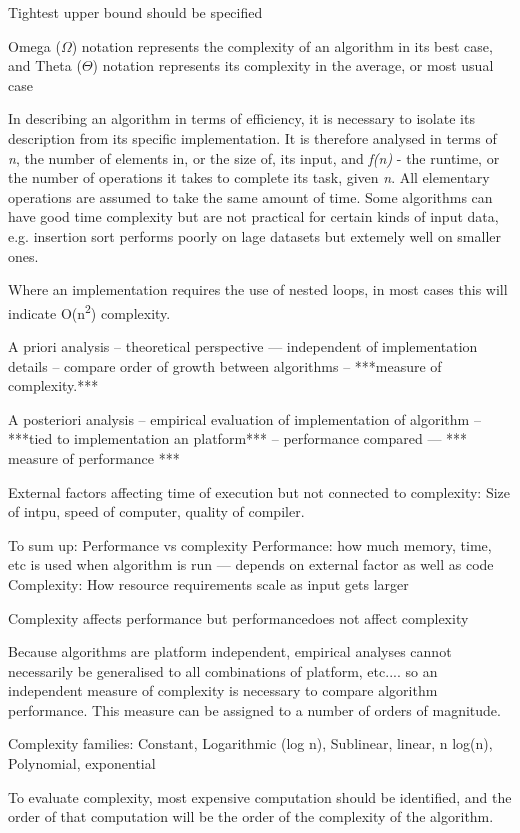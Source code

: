 \documentclass[12pt, a4paper]{article}
\begin{document}
Tightest upper bound should be specified

Omega ($\Omega$) notation represents the complexity of an algorithm in its best case, and Theta ($\Theta$) notation represents its complexity in the average, or most usual case

In describing an algorithm in terms of efficiency, it is necessary to isolate its description from its specific implementation. It is therefore analysed in terms of \emph{n}, the number of elements in, or the size of, its input, and \emph{f(n)} - the runtime, or the number of operations it takes to complete its task, given \emph{n}. All elementary operations are assumed to take the same amount of time.
Some algorithms can have good time complexity but are not practical for certain kinds of input data, e.g. insertion sort performs poorly on lage datasets but extemely well on smaller ones.

Where an implementation requires the use of nested loops, in most cases this will indicate O(n\textsuperscript{2}) complexity.

A priori analysis -- theoretical perspective --- independent of implementation details -- compare order of growth between algorithms -- ***measure of complexity.***

A posteriori analysis -- empirical evaluation of implementation of  algorithm -- ***tied to implementation an platform*** -- performance compared --- *** measure of performance ***

External factors affecting time of execution but not connected to complexity:
Size of intpu, speed of computer, quality of compiler.

To sum up: Performance vs complexity
Performance: how much memory, time, etc is used when algorithm is run --- depends on external factor as well as code 
Complexity: How resource requirements scale as input gets larger

Complexity affects performance but performancedoes not affect complexity

Because algorithms are platform independent, empirical analyses cannot necessarily be generalised to all combinations of platform, etc.... so an independent measure of complexity is necessary to compare algorithm performance. This measure can be assigned to a number of orders of magnitude. 

Complexity families:
    Constant, Logarithmic (log n), Sublinear, linear, n log(n), Polynomial, exponential

To evaluate complexity, most expensive computation should be identified, and the order of that computation will be the order of the complexity of the algorithm.
\end{document}

